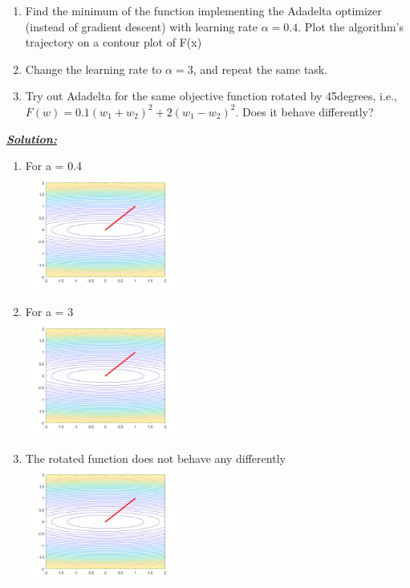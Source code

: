 \documentclass{article}
\begin{document}
\begin{enumerate}
    \item Find the minimum of the function implementing the Adadelta optimizer (instead of
            gradient descent) with learning rate $\alpha = 0.4$. Plot the algorithm’s trajectory on a contour
            plot of F(x)
    \item Change the learning rate to $\alpha = 3$, and repeat the same task.
    \item Try out Adadelta for the same objective function rotated by 45degrees, i.e., 
            $ F(w) = 0.1(w_1+w_2)^2 + 2(w_1-w_2)^2$. Does it behave differently?
\end{enumerate}

\noindent \underline{\textbf{\textit{Solution:}}} \\ 

\begin{enumerate}
    \item For a = 0.4 \\ \includegraphics[width=0.4\textwidth]{problem80.4.png}
    \item For a = 3 \\  \includegraphics[width=0.4\textwidth]{problem83.png}
    \item The rotated function does not behave any differently \\ \includegraphics[width=0.4\textwidth]{problem8rotated.png}
            
\end{enumerate}
\end{document}
